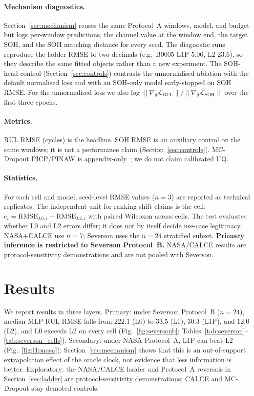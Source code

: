 \documentclass[preprint,12pt]{elsarticle}
\begin{document}
\paragraph{Mechanism diagnostics.}
Section~\ref{sec:mechanism} reuses the same Protocol~A windows, model, and budget but logs per-window predictions, the channel value at the window end, the target SOH, and the SOH matching distance for every seed.
The diagnostic runs reproduce the ladder RMSE to two decimals (e.g.\ B0005 L1P $5.06$, L2 $23.6$), so they describe the same fitted objects rather than a new experiment.
The SOH-head control (Section~\ref{sec:controls}) contrasts the unnormalised ablation with the default normalised loss and with an SOH-only model early-stopped on SOH RMSE.
For the unnormalised loss we also log $\|\nabla_\theta \mathcal{L}_{\mathrm{RUL}}\|/\|\nabla_\theta \mathcal{L}_{\mathrm{SOH}}\|$ over the first three epochs.

\paragraph{Metrics.}
RUL RMSE (cycles) is the headline.
SOH RMSE is an auxiliary control on the same windows; it is not a performance claim (Section~\ref{sec:controls}).
MC-Dropout PICP/PINAW is appendix-only~\cite{gal2016}; we do not claim calibrated UQ.

\paragraph{Statistics.}
For each cell and model, seed-level RMSE values ($n{=}3$) are reported as technical replicates.
The independent unit for ranking-shift claims is the cell: $e_i=\mathrm{RMSE}_{L0,i}-\mathrm{RMSE}_{L2,i}$ with paired Wilcoxon across cells.
The test evaluates whether L0 and L2 errors differ; it does not by itself decide use-case legitimacy.
NASA+CALCE use $n{=}7$; Severson uses the $n{=}24$ stratified subset.
\textbf{Primary inference is restricted to Severson Protocol~B.} NASA/CALCE results are protocol-sensitivity demonstrations and are not pooled with Severson.

\section{Results}
\label{sec:results}

We report results in three layers.
Primary: under Severson Protocol~B ($n{=}24$), median MLP RUL RMSE falls from $222.1$ (L0) to $33.5$ (L1), $30.3$ (L1P), and $12.0$ (L2), and L0 exceeds L2 on every cell (Fig.~\ref{fig:seversonb}; Tables~\ref{tab:severson}--\ref{tab:severson_cells}).
Secondary: under NASA Protocol~A, L1P can beat L2 (Fig.~\ref{fig:l1pnasa}); Section~\ref{sec:mechanism} shows that this is an out-of-support extrapolation effect of the oracle clock, not evidence that less information is better.
Exploratory: the NASA/CALCE ladder and Protocol~A reversals in Section~\ref{sec:ladder} are protocol-sensitivity demonstrations; CALCE and MC-Dropout stay demoted controls.
\end{document}
